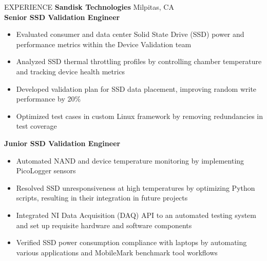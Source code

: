 \documentclass{resume} %
\begin{document}
\begin{rSection}{EXPERIENCE}
\textbf{Sandisk Technologies}  \hfill Milpitas, CA\\
\hspace*{4mm}\textbf{Senior SSD Validation Engineer}  \hfill {}
 \begin{itemize}[left=2em]
 \itemsep -0.5em \vspace{-0.5em}
     \item Evaluated consumer and data center Solid State Drive (SSD) power and performance metrics within the Device Validation team
     \item Analyzed SSD thermal throttling profiles by controlling chamber temperature and tracking device health metrics
   \item Developed validation plan for SSD data placement, improving random write performance by 20\%
     \item Optimized test cases in custom Linux framework by removing redundancies in test coverage

 \end{itemize}

\hspace*{4mm}\textbf{Junior SSD Validation Engineer}  \hfill {}
 \begin{itemize}[left=2em]
 \itemsep -0.5em \vspace{-0.5em}
    \item Automated NAND and device temperature monitoring by implementing PicoLogger sensors
     \item Resolved SSD unresponsiveness at high temperatures by optimizing Python scripts, resulting in their integration in future projects
    \item Integrated NI Data Acquisition (DAQ) API to an automated testing system and set up requisite hardware and software components
    \item Verified SSD power consumption compliance with laptops by automating various applications and MobileMark benchmark tool workflows
 \end{itemize}



\end{rSection} 
\end{document}
